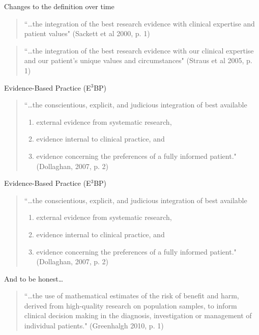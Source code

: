 \documentclass{beamer}
\begin{document}
\begin{frame}{Changes to the definition over time}
	\begin{quote}
	``\dots the integration of the best research evidence with clinical expertise and patient values" (Sackett et al 2000, p. 1)
	\end{quote}
	
	\begin{quote}
	``\dots the integration of the best research evidence with our clinical expertise and our patient's unique values and circumstances" (Straus et al 2005, p. 1)
	\end{quote}
\end{frame}

\begin{frame}{Evidence-Based Practice ({E$^3$BP})}
	\begin{quote}
	``\dots the conscientious, explicit, and judicious integration of best available\\
		\begin{enumerate}
		\item external evidence from systematic research,
		\item evidence internal to clinical practice, and
		\item evidence concerning the preferences of a fully informed patient." (Dollaghan, 2007, p. 2)
		\end{enumerate}
	\end{quote}
\end{frame}

\begin{frame}{\alert{Evidence-}Based Practice ({E$^3$BP})}
	\begin{quote}
	``\dots the conscientious, explicit, and judicious integration of  best available\\
		\begin{enumerate}
		\item external \alert{evidence} from systematic research,
		\item \alert{evidence} internal to clinical practice, and
		\item \alert{evidence} concerning the preferences of a fully informed patient." (Dollaghan, 2007, p. 2)
		\end{enumerate}
	\end{quote}
\end{frame}

\begin{frame}{And to be honest\dots}
	\begin{quote}
	``\dots the use of mathematical estimates of the risk of benefit and harm, derived from high-quality research on population samples, to inform clinical decision making in the diagnosis, investigation or management of individual patients." (Greenhalgh 2010, p. 1)
	\end{quote}
\end{frame}
\end{document}

